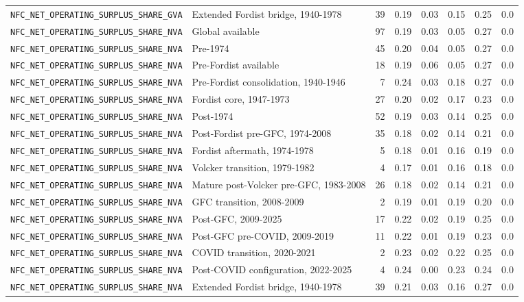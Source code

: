 \begin{landscape}
\begin{longtable}{p{4.4cm}p{3.8cm}rrrrrr}
\\
\nolinkurl{NFC_NET_OPERATING_SURPLUS_SHARE_GVA} & Extended Fordist bridge, 1940-1978 & 39 & 0.19 & 0.03 & 0.15 & 0.25 & 0.0
\\
\nolinkurl{NFC_NET_OPERATING_SURPLUS_SHARE_NVA} & Global available & 97 & 0.19 & 0.03 & 0.05 & 0.27 & 0.0
\\
\nolinkurl{NFC_NET_OPERATING_SURPLUS_SHARE_NVA} & Pre-1974 & 45 & 0.20 & 0.04 & 0.05 & 0.27 & 0.0
\\
\nolinkurl{NFC_NET_OPERATING_SURPLUS_SHARE_NVA} & Pre-Fordist available & 18 & 0.19 & 0.06 & 0.05 & 0.27 & 0.0
\\
\nolinkurl{NFC_NET_OPERATING_SURPLUS_SHARE_NVA} & Pre-Fordist consolidation, 1940-1946 & 7 & 0.24 & 0.03 & 0.18 & 0.27 & 0.0
\\
\nolinkurl{NFC_NET_OPERATING_SURPLUS_SHARE_NVA} & Fordist core, 1947-1973 & 27 & 0.20 & 0.02 & 0.17 & 0.23 & 0.0
\\
\nolinkurl{NFC_NET_OPERATING_SURPLUS_SHARE_NVA} & Post-1974 & 52 & 0.19 & 0.03 & 0.14 & 0.25 & 0.0
\\
\nolinkurl{NFC_NET_OPERATING_SURPLUS_SHARE_NVA} & Post-Fordist pre-GFC, 1974-2008 & 35 & 0.18 & 0.02 & 0.14 & 0.21 & 0.0
\\
\nolinkurl{NFC_NET_OPERATING_SURPLUS_SHARE_NVA} & Fordist aftermath, 1974-1978 & 5 & 0.18 & 0.01 & 0.16 & 0.19 & 0.0
\\
\nolinkurl{NFC_NET_OPERATING_SURPLUS_SHARE_NVA} & Volcker transition, 1979-1982 & 4 & 0.17 & 0.01 & 0.16 & 0.18 & 0.0
\\
\nolinkurl{NFC_NET_OPERATING_SURPLUS_SHARE_NVA} & Mature post-Volcker pre-GFC, 1983-2008 & 26 & 0.18 & 0.02 & 0.14 & 0.21 & 0.0
\\
\nolinkurl{NFC_NET_OPERATING_SURPLUS_SHARE_NVA} & GFC transition, 2008-2009 & 2 & 0.19 & 0.01 & 0.19 & 0.20 & 0.0
\\
\nolinkurl{NFC_NET_OPERATING_SURPLUS_SHARE_NVA} & Post-GFC, 2009-2025 & 17 & 0.22 & 0.02 & 0.19 & 0.25 & 0.0
\\
\nolinkurl{NFC_NET_OPERATING_SURPLUS_SHARE_NVA} & Post-GFC pre-COVID, 2009-2019 & 11 & 0.22 & 0.01 & 0.19 & 0.23 & 0.0
\\
\nolinkurl{NFC_NET_OPERATING_SURPLUS_SHARE_NVA} & COVID transition, 2020-2021 & 2 & 0.23 & 0.02 & 0.22 & 0.25 & 0.0
\\
\nolinkurl{NFC_NET_OPERATING_SURPLUS_SHARE_NVA} & Post-COVID configuration, 2022-2025 & 4 & 0.24 & 0.00 & 0.23 & 0.24 & 0.0
\\
\nolinkurl{NFC_NET_OPERATING_SURPLUS_SHARE_NVA} & Extended Fordist bridge, 1940-1978 & 39 & 0.21 & 0.03 & 0.16 & 0.27 & 0.0

\end{longtable}
\end{landscape}

